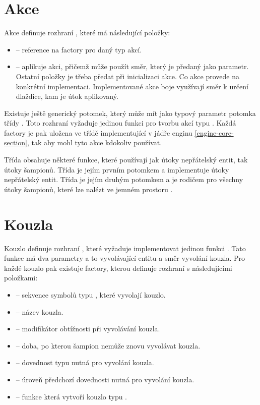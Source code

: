 \section{Akce}
Akce definuje rozhraní , které má následující položky:

\begin{itemize}
\item {} -- reference na factory pro daný typ akcí.
\item {} -- aplikuje akci, přičemž může použít směr, který je předaný jako parametr. Ostatní položky je třeba předat při inicializaci akce. 
	Co akce provede na konkrétní implementaci. Implementované akce boje využívají směr k určení dlaždice, kam je útok aplikovaný.
\end{itemize}

Existuje ještě generický potomek, který může mít jako typový parametr potomka třídy . Toto rozhraní vyžaduje jedinou funkci
 pro tvorbu akcí typu . Každá factory je pak uložena ve třídě implementující  v jádře
enginu \vref{engine-core-section}, tak aby mohl tyto akce kdokoliv používat. 

Třída  obsahuje některé funkce, které používají jak útoky nepřátelský entit, tak útoky šampionů.
Třída  je jejím prvním potomkem a implementuje útoky nepřátelský entit. Třída  
je jejím druhým potomkem a je rodičem pro všechny útoky šampionů, které lze nalézt ve jemném prostoru .

\section{Kouzla}
Kouzlo definuje rozhraní , které vyžaduje implementovat jedinou funkci . Tato funkce má dva parametry 
a to vyvolávající entitu a směr vyvolání kouzla. Pro každé kouzlo pak existuje factory, kterou definuje rozhraní  
s následujícími položkami:
\begin{itemize}  
\item {} -- sekvence symbolů typu , které vyvolají kouzlo.
\item {} -- název kouzla. 
\item {} -- modifikátor obtížnosti při vyvolávání kouzla. 
\item {} -- doba, po kterou šampion nemůže znovu vyvolávat kouzla.
\item {} -- dovednost typu  nutná pro vyvolání kouzla.
\item {} -- úroveň předchozí dovednosti nutná pro vyvolání kouzla.
\item {} -- funkce která vytvoří kouzlo typu .
\end{itemize}  

